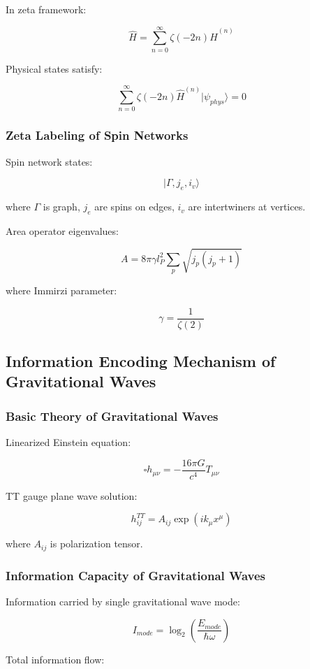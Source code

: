 \documentclass[12pt,a4paper]{article}
\begin{document}
In zeta framework:

$$\hat{H} = \sum_{n=0}^{\infty} \zeta(-2n) \hat{H}^{(n)}$$

Physical states satisfy:

$$\sum_{n=0}^{\infty} \zeta(-2n) \hat{H}^{(n)} |\psi_{phys}\rangle = 0$$

\subsubsection{Zeta Labeling of Spin Networks}

Spin network states:

$$|\Gamma, j_e, i_v\rangle$$

where $\Gamma$ is graph, $j_e$ are spins on edges, $i_v$ are intertwiners at vertices.

Area operator eigenvalues:

$$A = 8\pi\gamma l_P^2 \sum_{p} \sqrt{j_p(j_p+1)}$$

where Immirzi parameter:

$$\gamma = \frac{1}{\zeta(2)}$$

\subsection{Information Encoding Mechanism of Gravitational Waves}

\subsubsection{Basic Theory of Gravitational Waves}

Linearized Einstein equation:

$$\square h_{\mu\nu} = -\frac{16\pi G}{c^4} T_{\mu\nu}$$

TT gauge plane wave solution:

$$h_{ij}^{TT} = A_{ij} \exp(ik_\mu x^\mu)$$

where $A_{ij}$ is polarization tensor.

\subsubsection{Information Capacity of Gravitational Waves}

Information carried by single gravitational wave mode:

$$I_{mode} = \log_2\left(\frac{E_{mode}}{\hbar\omega}\right)$$

Total information flow:
\end{document}
